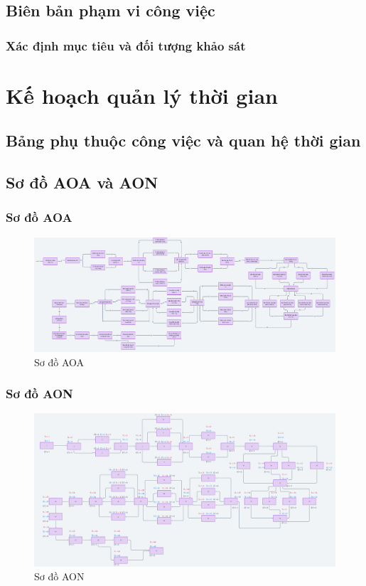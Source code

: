 \subsection{Biên bản phạm vi công việc}
\subsubsection{Xác định mục tiêu và đối tượng khảo sát}
\section{Kế hoạch quản lý thời gian}
\subsection{Bảng phụ thuộc công việc và quan hệ thời gian}
\subsection{Sơ đồ AOA và AON}
\subsubsection{Sơ đồ AOA}
\begin{figure}[H]
    \centering
    \includegraphics[width=\textwidth]{images/aoa.png}
    \caption{Sơ đồ AOA}
\end{figure}
\subsubsection{Sơ đồ AON}
\begin{figure}[H]
    \centering
    \includegraphics[width=\textwidth]{images/aon.png}
    \caption{Sơ đồ AON}
\end{figure}
